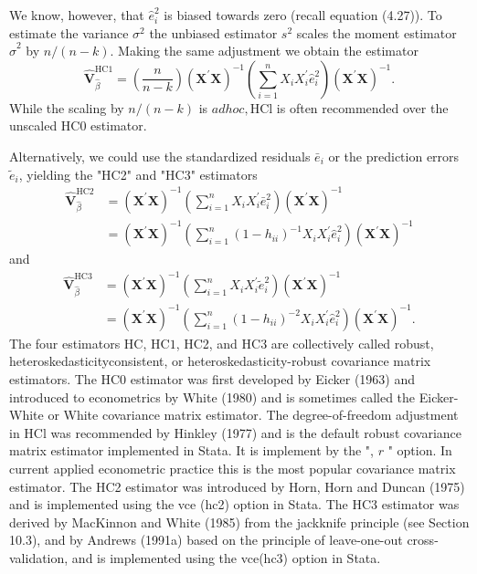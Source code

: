 \documentclass[10pt]{article}
\begin{document}
We know, however, that $\widehat{e}_{i}^{2}$ is biased towards zero (recall equation (4.27)). To estimate the variance $\sigma^{2}$ the unbiased estimator $s^{2}$ scales the moment estimator $\widehat{\sigma}^{2}$ by $n /(n-k)$. Making the same adjustment we obtain the estimator
$$
\widehat{\boldsymbol{V}}_{\widehat{\beta}}^{\mathrm{HC1}}=\left(\frac{n}{n-k}\right)\left(\boldsymbol{X}^{\prime} \boldsymbol{X}\right)^{-1}\left(\sum_{i=1}^{n} X_{i} X_{i}^{\prime} \widehat{e}_{i}^{2}\right)\left(\boldsymbol{X}^{\prime} \boldsymbol{X}\right)^{-1} .
$$
While the scaling by $n /(n-k)$ is $a d h o c, \mathrm{HCl}$ is often recommended over the unscaled HC0 estimator.

Alternatively, we could use the standardized residuals $\bar{e}_{i}$ or the prediction errors $\widetilde{e}_{i}$, yielding the "HC2" and "HC3" estimators
$$
\begin{aligned}
\widehat{\boldsymbol{V}}_{\widehat{\beta}}^{\mathrm{HC} 2} &=\left(\boldsymbol{X}^{\prime} \boldsymbol{X}\right)^{-1}\left(\sum_{i=1}^{n} X_{i} X_{i}^{\prime} \bar{e}_{i}^{2}\right)\left(\boldsymbol{X}^{\prime} \boldsymbol{X}\right)^{-1} \\
&=\left(\boldsymbol{X}^{\prime} \boldsymbol{X}\right)^{-1}\left(\sum_{i=1}^{n}\left(1-h_{i i}\right)^{-1} X_{i} X_{i}^{\prime} \widehat{e}_{i}^{2}\right)\left(\boldsymbol{X}^{\prime} \boldsymbol{X}\right)^{-1}
\end{aligned}
$$
and
$$
\begin{aligned}
\widehat{\boldsymbol{V}}_{\widehat{\beta}}^{\mathrm{HC} 3} &=\left(\boldsymbol{X}^{\prime} \boldsymbol{X}\right)^{-1}\left(\sum_{i=1}^{n} X_{i} X_{i}^{\prime} \tilde{e}_{i}^{2}\right)\left(\boldsymbol{X}^{\prime} \boldsymbol{X}\right)^{-1} \\
&=\left(\boldsymbol{X}^{\prime} \boldsymbol{X}\right)^{-1}\left(\sum_{i=1}^{n}\left(1-h_{i i}\right)^{-2} X_{i} X_{i}^{\prime} \widehat{e}_{i}^{2}\right)\left(\boldsymbol{X}^{\prime} \boldsymbol{X}\right)^{-1} .
\end{aligned}
$$
The four estimators $\mathrm{HC}$, $\mathrm{HC1}$, HC2, and HC3 are collectively called robust, heteroskedasticityconsistent, or heteroskedasticity-robust covariance matrix estimators. The HC0 estimator was first developed by Eicker (1963) and introduced to econometrics by White (1980) and is sometimes called the Eicker-White or White covariance matrix estimator. The degree-of-freedom adjustment in $\mathrm{HCl}$ was recommended by Hinkley (1977) and is the default robust covariance matrix estimator implemented in Stata. It is implement by the ", $r$ " option. In current applied econometric practice this is the most popular covariance matrix estimator. The HC2 estimator was introduced by Horn, Horn and Duncan (1975) and is implemented using the vce (hc2) option in Stata. The HC3 estimator was derived by MacKinnon and White (1985) from the jackknife principle (see Section 10.3), and by Andrews (1991a) based on the principle of leave-one-out cross-validation, and is implemented using the vce(hc3) option in Stata.
\end{document}
